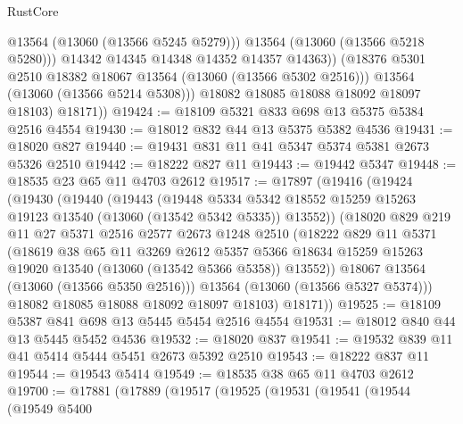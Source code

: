 \begin{lexlean}{RustCore}
\begin{coremodule}
                    @13564
                    (@13060 (@13566 @5245 @5279)))
                  @13564
                  (@13060 (@13566 @5218 @5280)))
                @14342
                @14345
                @14348
                @14352
                @14357
                @14363))
            (@18376 @5301 @2510 @18382 @18067 @13564 (@13060 (@13566 @5302 @2516)))
            @13564
            (@13060 (@13566 @5214 @5308)))
          @18082
          @18085
          @18088
          @18092
          @18097
          @18103)
        @18171))
@19424 := @18109 @5321 @833 @698 @13 @5375 @5384 @2516 @4554
@19430 := @18012 @832 @44 @13 @5375 @5382 @4536
@19431 := @18020 @827
@19440 := @19431 @831 @11 @41 @5347 @5374 @5381 @2673 @5326 @2510
@19442 := @18222 @827 @11
@19443 := @19442 @5347
@19448 := @18535 @23 @65 @11 @4703 @2612
@19517 := @17897
    (@19416
      (@19424
        (@19430
          (@19440
            (@19443
              (@19448
                @5334
                @5342
                @18552
                @15259
                @15263
                @19123
                @13540
                (@13060 (@13542 @5342 @5335))
                @13552))
            (@18020
              @829
              @219
              @11
              @27
              @5371
              @2516
              @2577
              @2673
              @1248
              @2510
              (@18222
                @829
                @11
                @5371
                (@18619
                  @38
                  @65
                  @11
                  @3269
                  @2612
                  @5357
                  @5366
                  @18634
                  @15259
                  @15263
                  @19020
                  @13540
                  (@13060 (@13542 @5366 @5358))
                  @13552))
              @18067
              @13564
              (@13060 (@13566 @5350 @2516)))
            @13564
            (@13060 (@13566 @5327 @5374)))
          @18082
          @18085
          @18088
          @18092
          @18097
          @18103)
        @18171))
@19525 := @18109 @5387 @841 @698 @13 @5445 @5454 @2516 @4554
@19531 := @18012 @840 @44 @13 @5445 @5452 @4536
@19532 := @18020 @837
@19541 := @19532 @839 @11 @41 @5414 @5444 @5451 @2673 @5392 @2510
@19543 := @18222 @837 @11
@19544 := @19543 @5414
@19549 := @18535 @38 @65 @11 @4703 @2612
@19700 := @17881
    (@17889
      (@19517
        (@19525
          (@19531
            (@19541
              (@19544
                (@19549
                  @5400

\end{coremodule}
\end{lexlean}
